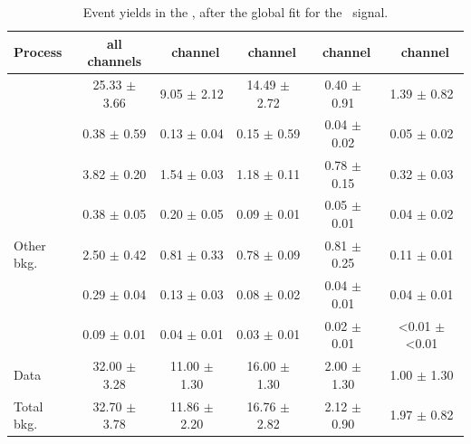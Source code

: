   \begin{table}[htbp]
	\centering
	\caption{Event yields in the \STCR, after the global fit for the \Zut\ signal.}
	\begin{tabular} {l c c c c c  }
		\toprule
		Process & all channels & \mumumu\ channel & \emumu\ channel & \eemu\ channel &\eee\ channel  \\
		\midrule
		\NPL\ \ttbar& 25.33 $ \pm $ 3.66 &  9.05 $\pm$ 2.12 & 14.49 $\pm$ 2.72 & 0.40 $\pm$ 0.91 & 1.39 $\pm$ 0.82 \\ 
		\ttZ 		&  0.38 $ \pm $ 0.59 &  0.13 $\pm$ 0.04 &  0.15 $\pm$ 0.59 & 0.04 $\pm$ 0.02 & 0.05 $\pm$ 0.02 \\ 
		\WZ 		&  3.82 $ \pm $ 0.20 &  1.54 $\pm$ 0.03 &  1.18 $\pm$ 0.11 & 0.78 $\pm$ 0.15 & 0.32 $\pm$ 0.03\\ 
		\ZZ 		&  0.38 $ \pm $ 0.05 &  0.20 $\pm$ 0.05 &  0.09 $\pm$ 0.01 & 0.05 $\pm$ 0.01 & 0.04 $\pm$ 0.02\\ 
		Other bkg.	&  2.50 $ \pm $ 0.42 &  0.81 $\pm$ 0.33 &  0.78 $\pm$ 0.09 & 0.81 $\pm$ 0.25 & 0.11 $\pm$ 0.01 \\ 
		\tZq 		&  0.29 $ \pm $ 0.04 &  0.13 $\pm$ 0.03 &  0.08 $\pm$ 0.02 & 0.04 $\pm$ 0.01 & 0.04 $\pm$ 0.01 \B \\ 
		\hdashline
		\kZut  		&  0.09 $ \pm $ 0.01 &  0.04 $\pm$ 0.01 &  0.03 $\pm$ 0.01 & 0.02 $\pm$ 0.01 & <0.01 $\pm$ <0.01 \T \B\\
		\hdashline
		Data 		& 32.00 $ \pm $ 3.28 & 11.00 $\pm$ 1.30 & 16.00 $\pm$ 1.30 & 2.00 $\pm$ 1.30 & 1.00  $\pm$ 1.30 \T \\
		Total bkg.	& 32.70 $ \pm $ 3.78 & 11.86 $\pm$ 2.20 & 16.76 $\pm$ 2.82 & 2.12 $\pm$ 0.90 & 1.97  $\pm$ 0.82 \\
		\bottomrule
	\end{tabular}
	\label{tab:PYieldSTCR}
\end{table}
